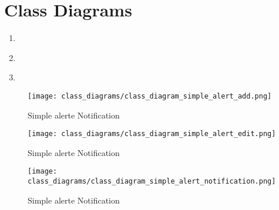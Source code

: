 \chapter{Class Diagrams}\label{ch:class_diagrams}

\begin{enumerate}
    \item~
    \item~
    \item~
\end{enumerate}

\begin{figure}[]
	\centering
    \caption{Simple alerte Notification}\label{fig:cls_simple_alert_add}
    \texttt{[image: class\_diagrams/class\_diagram\_simple\_alert\_add.png]}
\end{figure}

\begin{figure}[]
	\centering
    \caption{Simple alerte Notification}\label{fig:cls_simple_alert_edit}
    \texttt{[image: class\_diagrams/class\_diagram\_simple\_alert\_edit.png]}
\end{figure}

\begin{figure}[]
	\centering
    \caption{Simple alerte Notification}\label{fig:cls_simple_alert_notification}
    \texttt{[image: class\_diagrams/class\_diagram\_simple\_alert\_notification.png]}
\end{figure}
